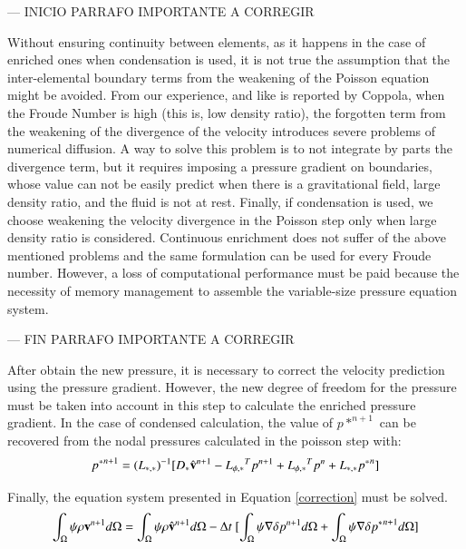 --- INICIO PARRAFO IMPORTANTE A CORREGIR

Without ensuring continuity between elements, as it happens in the case of enriched ones when condensation is used, it is not true the assumption that the inter-elemental boundary terms from the weakening of the Poisson equation might be avoided. From our experience, and like is reported by Coppola\cite{Coppola05}, when the Froude Number is high (this is, low density ratio), the forgotten term from the weakening of the divergence of the velocity introduces severe problems of numerical diffusion. A way to solve this problem is to not integrate by parts the divergence term, but it requires imposing a pressure gradient on boundaries, whose value can not be easily predict when there is a gravitational field, large density ratio, and the fluid is not at rest. Finally, if condensation is used, we choose weakening the velocity divergence in the Poisson step only when large density ratio is considered. Continuous enrichment does not suffer of the above mentioned problems and the same formulation can be used for every Froude number. However, a loss of computational performance must be paid because the necessity of memory management to assemble the variable-size pressure equation system.

--- FIN PARRAFO IMPORTANTE A CORREGIR

% 

After obtain the new pressure, it is necessary to correct the velocity prediction using the pressure gradient. However, the new degree of freedom for the pressure must be taken into account in this step to calculate the enriched pressure gradient. In the case of condensed calculation, the value of $p*^{n+1}$ can be recovered from the nodal pressures calculated in the poisson step with:
\begin{equation}
  {p^*}^{n+1} = {(L_{*,*})}^{-1}[D_* \hat{\mathbf{v}}^{n+1} - {L_{\phi,*}}^Tp^{n+1} + {L_{\phi,*}}^Tp^{n} + L_{*,*}{p^*}^n]
  \label{recovering}
\end{equation}

Finally, the equation system presented in Equation \ref{correction} must be solved.
 \begin{equation}
  \int_{\Omega} \psi \rho \vv^{n+1} d\Omega = \int_{\Omega} \psi \rho \hat{\vv}^{n+1} d\Omega - \Delta t \ [\int_{\Omega} \psi \nabla \delta p^{n+1} d\Omega + \int_{\Omega} \psi \nabla \delta {p^*}^{n+1} d\Omega]
  \label{correction}
 \end{equation}

